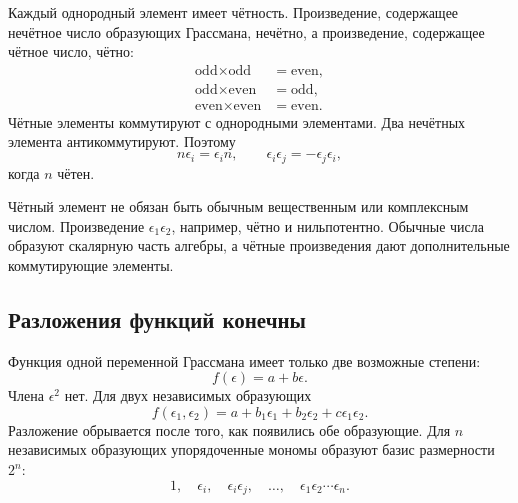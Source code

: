 Каждый однородный элемент имеет чётность. Произведение, содержащее нечётное число образующих Грассмана, нечётно, а произведение, содержащее чётное число, чётно:
\begin{align}
\text{odd}\times\text{odd}&=\text{even},\\
\text{odd}\times\text{even}&=\text{odd},\\
\text{even}\times\text{even}&=\text{even}.
\end{align}
Чётные элементы коммутируют с однородными элементами. Два нечётных элемента антикоммутируют. Поэтому
\begin{equation}
n\epsilon_i=\epsilon_i n,
\qquad
\epsilon_i\epsilon_j=-\epsilon_j\epsilon_i,
\end{equation}
когда \(n\) чётен.

Чётный элемент не обязан быть обычным вещественным или комплексным числом. Произведение \(\epsilon_1\epsilon_2\), например, чётно и нильпотентно. Обычные числа образуют скалярную часть алгебры, а чётные произведения дают дополнительные коммутирующие элементы.

\begin{classroomqa}
\end{classroomqa}

\subsection{Разложения функций конечны}

Функция одной переменной Грассмана имеет только две возможные степени:
\begin{equation}
f(\epsilon)=a+b\epsilon.
\end{equation}
Члена \(\epsilon^2\) нет. Для двух независимых образующих
\begin{equation}
f(\epsilon_1,\epsilon_2)
=a+b_1\epsilon_1+b_2\epsilon_2+c\epsilon_1\epsilon_2.
\end{equation}
Разложение обрывается после того, как появились обе образующие. Для \(n\) независимых образующих упорядоченные мономы образуют базис размерности \(2^n\):
\begin{equation}
1,\quad
\epsilon_i,\quad
\epsilon_i\epsilon_j,\quad
\ldots,\quad
\epsilon_1\epsilon_2\cdots\epsilon_n.
\end{equation}

